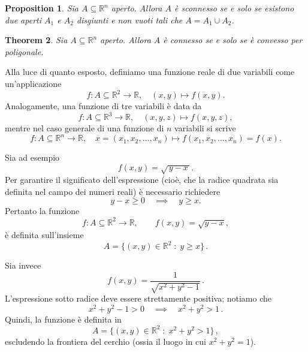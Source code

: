 \documentclass{article}
\theoremstyle{plain}
\newtheorem{thm}{Theorem}[section]
\newtheorem{prop}[thm]{Proposition}
\theoremstyle{definition}
\theoremstyle{remark}
\begin{document}
\vspace{10pt}

\begin{bxthm}
\begin{prop}
   Sia $A\subseteq\mathbb{R}^n$ aperto.
   Allora $A$ è sconnesso se e solo se esistono due aperti $A_1$ e $A_2$ disgiunti e non vuoti tali che $A=A_1\cup A_2$.
\end{prop}
\end{bxthm}

\vspace{10pt}

\begin{bxthm}
\begin{thm}
    Sia $A\subseteq\mathbb{R}^n$ aperto.
    Allora $A$ è connesso se e solo se è convesso per poligonale.
\end{thm}
\end{bxthm}

\vspace{10pt}

Alla luce di quanto esposto, definiamo una funzione reale di due variabili come un'applicazione
\[
f: A \subseteq \mathbb{R}^2 \to \mathbb{R},\quad (x, y) \mapsto f(x, y).
\]
Analogamente, una funzione di tre variabili è data da
\[
f: A \subseteq \mathbb{R}^3 \to \mathbb{R},\quad (x, y, z) \mapsto f(x, y, z),
\]
mentre nel caso generale di una funzione di $n$ variabili si scrive
\[
f: A \subseteq \mathbb{R}^n \to \mathbb{R},\quad x = (x_1, x_2, \dots, x_n) \mapsto f(x_1, x_2, \dots, x_n) = f(x).
\]

\vspace{10pt}


Sia ad esempio 
\[
f(x,y)=\sqrt{\,y-x\,}.
\]
Per garantire il significato dell'espressione (cioè, che la radice quadrata sia definita nel campo dei numeri reali) è necessario richiedere
\[
y-x\ge 0 \quad\implies\quad y\ge x.
\]
Pertanto la funzione 
\[
f \colon A \subseteq \mathbb{R}^2 \to \mathbb{R}, \qquad f(x,y)=\sqrt{y-x},
\]
è definita sull'insieme
\[
A=\{(x,y)\in\mathbb{R}^2 \;:\; y\ge x\}\,.
\]

Sia invece 
\[
f(x,y)=\frac{1}{\sqrt{x^2+y^2-1}}\,.
\]
L'espressione sotto radice deve essere strettamente positiva; notiamo che
\[
x^2+y^2-1>0 \quad\implies\quad x^2+y^2>1\,.
\]
Quindi, la funzione è definita in
\[
A=\{(x,y)\in\mathbb{R}^2 \;:\; x^2+y^2>1\}\,,
\]
escludendo la frontiera del cerchio (ossia il luogo in cui \(x^2+y^2=1\)).
\end{document}
